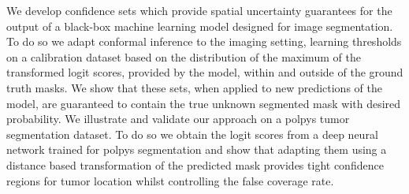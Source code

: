 We develop confidence sets which provide spatial uncertainty guarantees for the output of a black-box machine learning model designed for image segmentation. To do so we adapt conformal inference to the imaging setting, learning thresholds  on a calibration dataset based on the distribution of the maximum of the transformed logit scores, provided by the model, within and outside of the ground truth masks. We show that these sets, when applied to new predictions of the model, are guaranteed to contain the true unknown segmented mask with desired probability. We illustrate and validate our approach on a polpys tumor segmentation dataset. To do so we obtain the logit scores from a deep neural network trained for polpys segmentation and show that adapting them using a distance based transformation of the predicted mask provides tight confidence regions for tumor location whilst controlling the false coverage rate. 